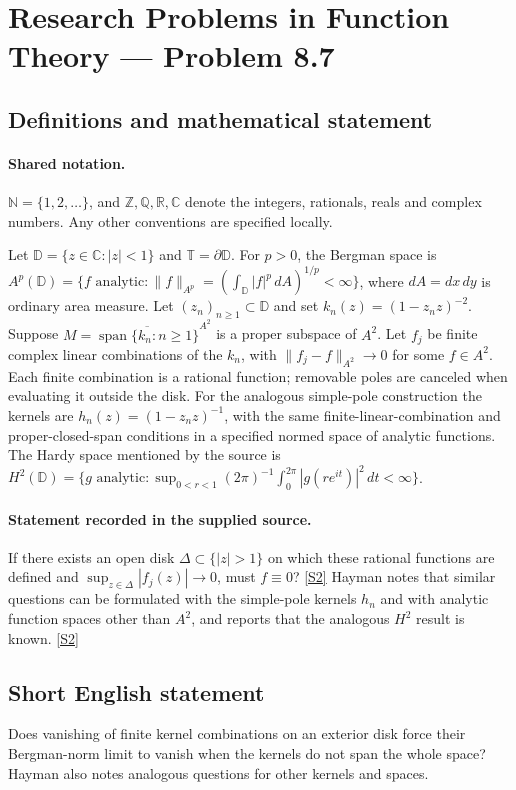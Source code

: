 \documentclass[11pt]{book}
\newcommand{\sref}[2]{\hyperlink{source:#1:#2}{[S#2]}}
\begin{document}
\section{Research Problems in Function Theory — Problem 8.7}\label{statement}

\subsection{Definitions and mathematical statement}

\paragraph{Shared notation.}$\mathbb N=\{1,2,\ldots\}$, and $\mathbb Z,\mathbb Q,\mathbb R,\mathbb C$ denote the integers, rationals, reals and complex numbers. Any other conventions are specified locally.


Let $\mathbb D=\{z\in\mathbb C:|z|<1\}$ and $\mathbb T=\partial\mathbb D$. For $p>0$, the Bergman space is $A^p(\mathbb D)=\{f\text{ analytic}:\|f\|_{A^p}=(\int_{\mathbb D}|f|^p\,dA)^{1/p}<\infty\}$, where $dA=dx\,dy$ is ordinary area measure. Let $(z_n)_{n\ge1}\subset\mathbb D$ and set $k_n(z)=(1-z_nz)^{-2}$. Suppose $M=\overline{\operatorname{span}\{k_n:n\ge1\}}^{A^2}$ is a proper subspace of $A^2$. Let $f_j$ be finite complex linear combinations of the $k_n$, with $\|f_j-f\|_{A^2}\to0$ for some $f\in A^2$. Each finite combination is a rational function; removable poles are canceled when evaluating it outside the disk. For the analogous simple-pole construction the kernels are $h_n(z)=(1-z_nz)^{-1}$, with the same finite-linear-combination and proper-closed-span conditions in a specified normed space of analytic functions. The Hardy space mentioned by the source is $H^2(\mathbb D)=\{g\text{ analytic}:\sup_{0<r<1}(2\pi)^{-1}\int_0^{2\pi}|g(re^{it})|^2\,dt<\infty\}$.
\paragraph{Statement recorded in the supplied source.}
If there exists an open disk $\Delta\subset\{|z|>1\}$ on which these rational functions are defined and $\sup_{z\in\Delta}|f_j(z)|\to0$, must $f\equiv0$? \sref{statement}{2}
Hayman notes that similar questions can be formulated with the simple-pole kernels $h_n$ and with analytic function spaces other than $A^2$, and reports that the analogous $H^2$ result is known. \sref{statement}{2}
\subsection{Short English statement}
Does vanishing of finite kernel combinations on an exterior disk force their Bergman-norm limit to vanish when the kernels do not span the whole space? Hayman also notes analogous questions for other kernels and spaces.
\end{document}
